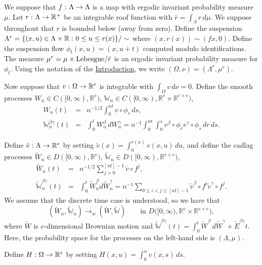 \documentclass[aop,MSNbibl,seceqn,dvips]{arximspdf}
\newcommand{\R}{\mathbb{R}}
\newcommand{\BBW}{\mathbb{W}}
\newcommand{\tildev}{\tilde{v}}
\newcommand{\tildeW}{\widetilde{W}}
\newcommand{\tildeBBW}{\widetilde{\mathbb W}}
\begin{document}
We suppose that $f\dvtx\Lambda\to\Lambda$ is a map with ergodic invariant
probability measure $\mu$.
Let $r\dvtx\Lambda\to\R^+$ be an integrable roof function with
$\bar r=\int_\Lambda r \,d\mu$. We suppose throughout that $r$ is bounded below
(away from zero).
Define the suspension
$\Lambda^r=\{(x,u)\in\Lambda\times\R\dvtx0\le u\le r(x)\}/\sim$ where
$(x,r(x))\sim(fx,0)$. Define the suspension flow $\phi
_t(x,u)=(x,u+t)$ computed
modulo identifications. The measure $\mu^r=\mu\times{\rm
Lebesgue}/\bar
r$ is an ergodic invariant probability measure for $\phi_t$.
Using the notation of the \hyperref[sec-intro]{Introduction}, we write
$(\Omega,\nu)=(\Lambda^r,\mu^r)$.

Now suppose that $v\dvtx\Omega\to\R^e$ is integrable with
$\int_{\Omega}v \,d\nu=0$.
Define
the smooth processes $W_n\in C([0,\infty),\R^e)$, $\BBW_n\in
C([0,\infty
),\R^e\times\R^{e\times e})$,
%
\begin{eqnarray*}
W_n(t) & =&n^{-{1}/2}\int_0^{nt}v
\circ\phi_s \,ds,
\\
\BBW_n^{\beta\gamma}(t) & =&\int_0^t
W_n^\beta \,dW_n^\gamma
=n^{-1}\int_0^{nt}\int
_0^s v^\beta\circ\phi_r
v^\gamma\circ\phi_s \,dr \,ds.
\end{eqnarray*}

Define $\tildev\dvtx\Lambda\to\R^e$ by setting $\tildev(x)=\int_0^{r(x)}v(x,u) \,du$,
and define the cadlag processes
$\tildeW_n\in D([0,\infty),\R^e)$, $\tildeBBW_n\in D([0,\infty),\R
^{e\times e})$,
%
\begin{eqnarray*}
\tildeW_n(t)&=&n^{-{1}/2}\sum_{j=0}^{[nt]-1}
\tildev\circ f^j,\\
 \tildeBBW_n^{\beta\gamma}(t)&=&\int
_0^t\tildeW_n^\beta d
\tildeW _n^\gamma =n^{-1} \sum
_{0\le i<j\le[nt]-1} \tildev ^\beta\circ f^i
\tildev^\gamma\circ f^j.
\end{eqnarray*}
%
We assume that the discrete time case is understood, so we have that
%
\begin{equation}
\label{eq-discrete} (\tildeW_n,\tildeBBW_n)
\to_w (\tildeW,\tildeBBW)\qquad\mbox{in } D\bigl([0,\infty),
\R^e\times\R^{e\times e}\bigr),
\end{equation}
%
where $\tildeW$ is $e$-dimensional Brownian motion and
$\tildeBBW^{\beta\gamma}(t)=\int_0^t\tildeW^\beta \,d\tildeW^\gamma+
\tilde E^{\beta\gamma}t$.
Here, the probability space for the processes on the left-hand side is
$(\Lambda,\mu)$.

Define $H\dvtx\Omega\to\R^e$ by setting $H(x,u)=\int_0^u v(x,s) \,ds$.
\end{document}

